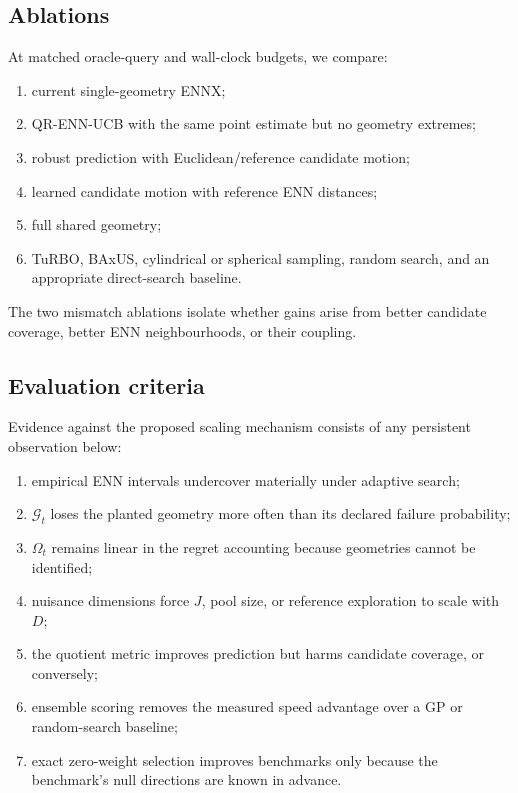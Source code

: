 \documentclass[11pt]{article}
\theoremstyle{definition}
\theoremstyle{remark}
\newcommand{\Gg}{\mathcal G}
\newcommand{\1}{\mathbf 1}
\begin{document}
\subsection{Ablations}

At matched oracle-query and wall-clock budgets, we compare:
\begin{enumerate}
\item current single-geometry ENNX;
\item QR-ENN-UCB with the same point estimate but no geometry extremes;
\item robust prediction with Euclidean/reference candidate motion;
\item learned candidate motion with reference ENN distances;
\item full shared geometry;
\item TuRBO, BAxUS, cylindrical or spherical sampling, random search, and an appropriate direct-search
baseline.
\end{enumerate}
The two mismatch ablations isolate whether gains arise from better candidate
coverage, better ENN neighbourhoods, or their coupling.

\subsection{Evaluation criteria}

Evidence against the proposed scaling mechanism consists of any persistent observation below:
\begin{enumerate}
\item empirical ENN intervals undercover materially under adaptive search;
\item $\Gg_t$ loses the planted geometry more often than its declared failure probability;
\item $\Omega_t$ remains linear in the regret accounting because geometries cannot be identified;
\item nuisance dimensions force $J$, pool size, or reference exploration to scale with $D$;
\item the quotient metric improves prediction but harms candidate coverage, or conversely;
\item ensemble scoring removes the measured speed advantage over a GP or random-search baseline;
\item exact zero-weight selection improves benchmarks only because the benchmark's null directions are known in
advance.
\end{enumerate}
\end{document}
